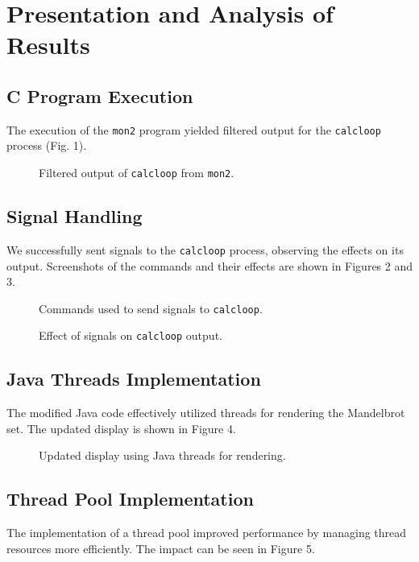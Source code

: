 \documentclass[a4paper,12pt]{article}
\begin{document}
\section{Presentation and Analysis of Results}
\subsection{C Program Execution}
The execution of the \texttt{mon2} program yielded filtered output for the \texttt{calcloop} process (Fig. 1).

\begin{figure}[h]
    \centering
    \caption{Filtered output of \texttt{calcloop} from \texttt{mon2}.}
\end{figure}

\subsection{Signal Handling}
We successfully sent signals to the \texttt{calcloop} process, observing the effects on its output. Screenshots of the commands and their effects are shown in Figures 2 and 3.

\begin{figure}[h]
    \centering
    \caption{Commands used to send signals to \texttt{calcloop}.}
\end{figure}

\begin{figure}[h]
    \centering
    \caption{Effect of signals on \texttt{calcloop} output.}
\end{figure}

\subsection{Java Threads Implementation}
The modified Java code effectively utilized threads for rendering the Mandelbrot set. The updated display is shown in Figure 4.

\begin{figure}[h]
    \centering
    \caption{Updated display using Java threads for rendering.}
\end{figure}

\subsection{Thread Pool Implementation}
The implementation of a thread pool improved performance by managing thread resources more efficiently. The impact can be seen in Figure 5.
\end{document}
